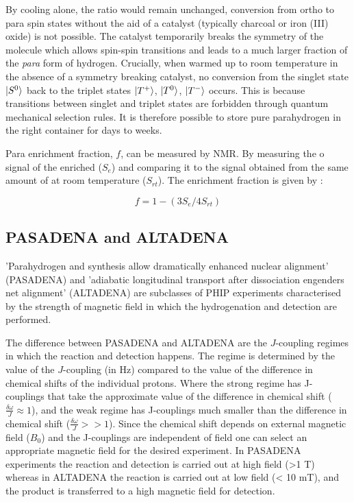  By cooling alone, the ratio would remain unchanged, conversion
 from ortho to para spin states without the aid of a catalyst (typically charcoal or iron (III) oxide) is not possible.
 The catalyst temporarily breaks the symmetry of the  molecule which allows spin-spin transitions and leads to
 a much larger fraction of the \textit{para} form of hydrogen. Crucially, when warmed up to
 room temperature in the absence of a symmetry breaking catalyst, no conversion from the singlet state $\ket{S^0}$ back to
 the triplet states $\ket{T^+}$, $\ket{T^0}$, $\ket{T^-}$ occurs. This is because transitions between singlet and triplet states
 are forbidden through quantum mechanical selection rules. It is therefore possible to store pure parahydrogen
 in the right container for days to weeks.

 Para enrichment fraction, $f$, can be measured by NMR. By measuring the o signal of the enriched  ($S_{e}$)
 and comparing it to the signal obtained from the same amount of  at room temperature ($S_{rt}$).
 The enrichment fraction is given by \citep{RN131, RN132}:

 \begin{equation}\label{pfrac}
   f = 1 -(3S_{e}/4S_{rt})
 \end{equation}

 \subsection{PASADENA and ALTADENA}\label{PASADENA and ALTADENA}

 'Parahydrogen and synthesis allow dramatically enhanced nuclear alignment'
 (PASADENA)\citep{RN129} and 'adiabatic longitudinal
 transport after dissociation engenders net alignment' (ALTADENA)\citep{RN128}
 are subclasses of PHIP experiments characterised by the strength of magnetic
 field in which the hydrogenation and detection are performed.

 The difference between PASADENA and ALTADENA are the $J$-coupling regimes in which the reaction and detection happens.
 The regime is determined by the value of the $J$-coupling (in Hz) compared to the value of the difference in chemical
 shifts of the individual protons. Where the strong regime has J-couplings that take the approximate value of the difference in chemical shift
 ($\frac{\delta{\omega}}{J}\approx1$), and the weak regime has J-couplings much smaller than the difference in chemical
 shift ($\frac{\delta{\omega}}{J}>>1$). Since the chemical shift depends on external magnetic field ($B_{0}$) and the
 J-couplings are independent of field one can select an appropriate magnetic field for the desired experiment.
 In PASADENA experiments the reaction and detection is carried out at high field (>1 T) whereas in
 ALTADENA the reaction is carried out at low field (< 10 mT), and the product is transferred to a high magnetic field for detection\citep{RN130}.


